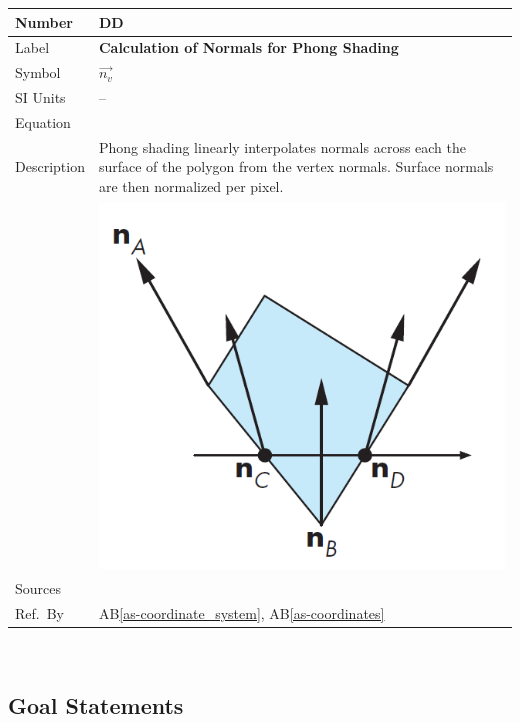 \documentclass[12pt]{article}
\newcommand{\colAwidth}{0.13\textwidth}
\newcommand{\colBwidth}{0.82\textwidth}
\newcounter{defnum} %
\newcounter{datadefnum} %
\newcommand{\aBref}[1]{AB\ref{#1}}
\begin{document}
\noindent
\begin{minipage}{\textwidth}
	\renewcommand*{\arraystretch}{1.5}
	\begin{tabular}{| p{\colAwidth} | p{\colBwidth}|}
		\hline
		\rowcolor[gray]{0.9}
		Number& DD{datadefnum}\thedatadefnum 
		\label{DD_Phong_Shading}\\
		\hline
		Label& \bf Calculation of Normals for Phong Shading\\
		\hline
		Symbol &$\vec{n_{v}}$\\
		\hline
		SI Units & --\\
		\hline
		Equation& \\
		\hline
		Description & Phong shading linearly interpolates normals across each 
		the surface of the polygon from the vertex normals. Surface normals are 
		then normalized per pixel.\\
		& \includegraphics[]{./images/phong-shading-interpolation} \\
		\hline
		Sources& \cite{shreiner2012}\\
		\hline
		Ref.\ By & \aBref{as-coordinate_system}, \aBref{as-coordinates} \\
		\hline
	\end{tabular}
\end{minipage}\\


\subsection{Goal Statements}
\end{document}
